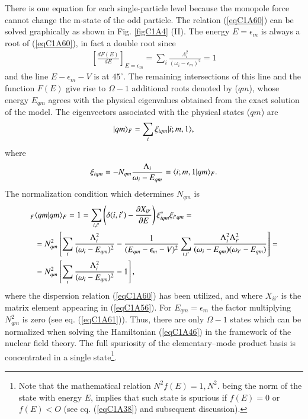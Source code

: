  There is one equation for each single-particle level because the monopole force cannot change the m-state of the odd particle. The relation (\ref{eqC1A60}) can be solved graphically as shown in Fig. \ref{figC1A4} (II). The energy $E =\epsilon_m$ is always a root of (\ref{eqC1A60}), in fact a double root since 
  \begin{align}\label{eqC1A61} 
 \left[\frac{dF(E)}{dE}\right]_{E=\epsilon_m}=\sum_i\frac{\Lambda^2_i}{\left(\omega_i-\epsilon_m\right)^2}=1
  \end{align}
and the line $E-\epsilon_m-V$ is at $45^\circ$. The remaining intersections of this line and the function $F(E)$ give rise to $\Omega-1$ additional roots denoted by ($qm$), whose energy $E_{qm}$ agrees with the physical eigenvalues obtained from the exact solution of the model. 
The eigenvectors associated with the physical states ($qm$) are 
  \begin{align}\label{eqC1A62} 
 |{qm} \rangle_F=\sum_i\xi_{iqm}|{i;m,1} \rangle,
  \end{align}
where 
  \begin{align}\label{eqC1A63} 
 \xi_{iqm}=-N_{qm}\frac{\Lambda_i}{\omega_i-E_{qm}}=\langle {i;m,1|qm} \rangle_F.
  \end{align}
The normalization condition which determines $N_{qm}$ is   \begin{align}\label{eqC1A64} 
\nonumber _F&\langle {qm|qm} \rangle_F=1=\sum_{i,i'}\left(\delta(i,i')-\frac{\partial X_{ii'}}{\partial E}\right)\xi^*_{iqm}\xi_{i'qm}=\\
\nonumber &=N^2_{qm}\left[\sum_i\frac{\Lambda^2_i}{(\omega_i-E_{qm})^2}-\frac{1}{(E_{qm}-\epsilon_m-V)^2}\sum_{i,i'}\frac{\Lambda^2_i\Lambda^2_{i'}}{(\omega_i-E_{qm})(\omega_{i'}-E_{qm})}\right]=\\
 &=N^2_{qm}\left[\sum_i\frac{\Lambda_i^2}{(\omega_i-E_{qm})^2}-1\right],
  \end{align}
where the dispersion relation (\ref{eqC1A60}) has been utilized, and where $X_{ii'}$ is the matrix element appearing in (\ref{eqC1A56}). For $E_{qm}=\epsilon_m$ the factor multiplying $N^2_{qm}$ is zero (see eq. (\ref{eqC1A61})). Thus, there are only $\Omega-1$ states which can be normalized when solving the Hamiltonian (\ref{eqC1A46}) in the framework of the nuclear field theory. The full spuriosity of the elementary--mode product basis is concentrated in a single state\footnote{ Note that the mathematical relation $N^2f(E)=1, N^2$. being the norm of the state with energy $E$, implies that such state is spurious if $f(E)= 0$ or $f(E)<O$ (see cq. (\ref{eqC1A38}) and subsequent discussion).}.

